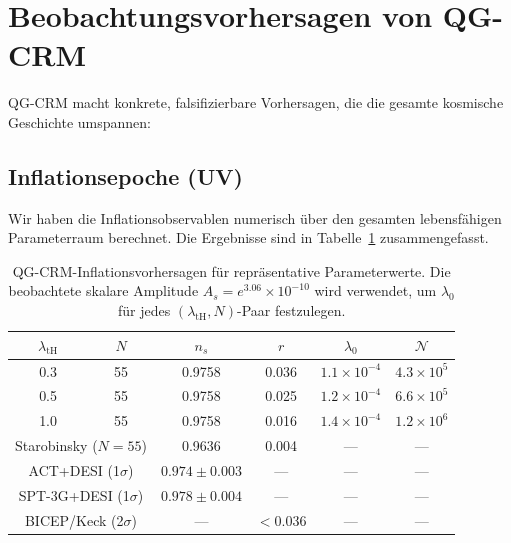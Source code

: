 \documentclass[aps,prd,twocolumn,superscriptaddress,nofootinbib]{revtex4-2}
\begin{document}
\section{Beobachtungsvorhersagen von QG-CRM}
\label{sec:predictions}

QG-CRM macht konkrete, falsifizierbare Vorhersagen, die die gesamte kosmische Geschichte umspannen:

\subsection{Inflationsepoche (UV)}

Wir haben die Inflationsobservablen numerisch über den gesamten lebensfähigen Parameterraum berechnet. Die Ergebnisse sind in Tabelle~\ref{tab:observables} zusammengefasst.

\begin{table}[h]
\caption{QG-CRM-Inflationsvorhersagen für repräsentative Parameterwerte. Die beobachtete skalare Amplitude $A_s = e^{3.06} \times 10^{-10}$ wird verwendet, um $\lambda_0$ für jedes $(\lambda_\mathrm{tH}, N)$-Paar festzulegen.}
\scriptsize
\setlength{\tabcolsep}{2pt}
\begin{tabular}{cccccc}
\toprule
$\lambda_\mathrm{tH}$ & $N$ & $n_s$ & $r$ & $\lambda_0$ & $\mathcal{N}$ \\
\midrule
0.3 & 55 & 0.9758 & 0.036 & $1.1 \times 10^{-4}$ & $4.3 \times 10^5$ \\
0.5 & 55 & 0.9758 & 0.025 & $1.2 \times 10^{-4}$ & $6.6 \times 10^5$ \\
1.0 & 55 & 0.9758 & 0.016 & $1.4 \times 10^{-4}$ & $1.2 \times 10^6$ \\
\midrule
\multicolumn{2}{c}{Starobinsky ($N=55$)} & 0.9636 & 0.004 & --- & --- \\
\multicolumn{2}{c}{ACT+DESI (1$\sigma$)} & $0.974 \pm 0.003$ & --- & --- & --- \\
\multicolumn{2}{c}{SPT-3G+DESI (1$\sigma$)} & $0.978 \pm 0.004$ & --- & --- & --- \\
\multicolumn{2}{c}{BICEP/Keck (2$\sigma$)} & --- & $<0.036$ & --- & --- \\
\bottomrule
\end{tabular}
\label{tab:observables}
\end{table}
\end{document}
